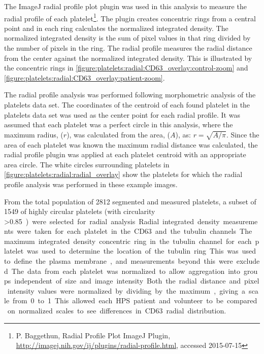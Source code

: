 The ImageJ radial profile plot plugin was used in this analysis to measure the radial profile of each platelet\footnote{P. Baggethun, Radial Profile Plot ImageJ Plugin, \url{http://imagej.nih.gov/ij/plugins/radial-profile.html}, accessed 2015-07-15}. The plugin creates concentric rings from a central point and in each ring calculates the normalized integrated density. The normalized integrated density is the sum of pixel values in that ring divided by the number of pixels in the ring. The radial profile measures the radial distance from the center against the normalized integrated density. This is illustrated by the concentric rings in \autoref{figure:platelets:radial:CD63_overlay:control-zoom} and \autoref{figure:platelets:radial:CD63_overlay:patient-zoom}.

The radial profile analysis was performed following morphometric analysis of the platelets data set. The coordinates of the centroid of each found platelet in the platelets data set was used as the center point for each radial profile. It was assumed that each platelet was a perfect circle in this analysis, where the maximum radius, ($r$), was calculated from the area, ($A$), as: $r=\sqrt{A/\pi}$. Since the area of each platelet was known the maximum radial distance was calculated, the radial profile plugin was applied at each platelet centroid with an appropriate area circle. The white circles surrounding platelets in \autoref{figure:platelets:radial:radial_overlay} show the platelets for which the radial profile analysis was performed in these example images.

From the total population of 2812 segmented and measured platelets, a subset of 1549 of highly circular platelets (with circularity \textgreater\SI{0.85}) were selected for radial analysis. Radial integrated density measurements were taken for each platelet in the CD63 and the tubulin channels. The maximum integrated density concentric ring in the tubulin channel for each platelet was used to determine the location of the tubulin ring. This was used to define the plasma membrane, and measurements beyond this were excluded.

The data from each platelet was normalized to allow aggregation into groups independent of size and image intensity. Both the radial distance and pixel intensity values were normalized by dividing by the maximum, giving a scale from 0 to 1. This allowed each HPS patient and volunteer to be compared on normalized scales to see differences in CD63 radial distribution.

